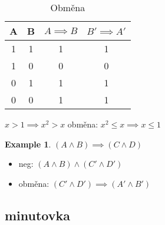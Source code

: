 \documentclass{article}
\theoremstyle{definition}
\newtheorem{exmp}{Example}[section]
\begin{document}
\begin{table}
\caption{Obměna}
\centering
  \begin{tabular}{ c c | c | c}

      A & B & $ A \implies B $ & $ B' \implies A' $ \\
      \hline
      1 & 1 & 1 & 1 \\
      1 & 0 & 0 & 0 \\
      0 & 1 & 1 & 1 \\
      0 & 0 & 1 & 1 
    
  
  \end{tabular}
\end{table}

$ x > 1 \implies x^2 > x $
obměna: $ x^2 \leq x \implies x \leq 1 $

\begin{exmp}
$ (A \land B) \implies (C \wedge D) $
\begin{itemize}
  \item neg: $ (A \land B) \land (C' \land D')  $
  \item obměna: $ (C' \land D') \implies (A' \wedge B') $
\end{itemize}

\end{exmp}





\subsection{minutovka}
\end{document}

